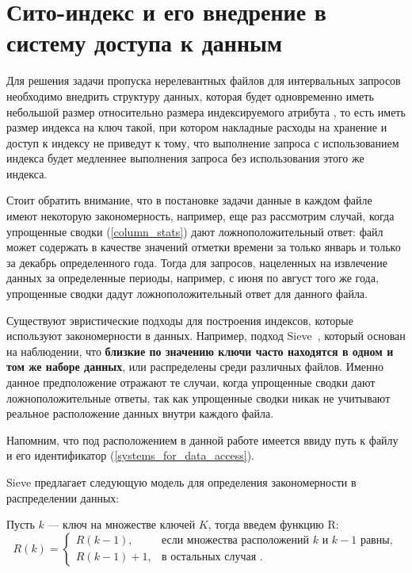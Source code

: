 \section{Сито-индекс и его внедрение в систему доступа к данным}

Для решения задачи пропуска нерелевантных файлов для интервальных запросов необходимо внедрить структуру данных, которая будет одновременно иметь небольшой размер относительно размера индексируемого атрибута , то есть иметь размер индекса на ключ  такой, при котором накладные расходы на хранение и доступ к индексу не приведут к тому, что выполнение запроса с использованием индекса будет медленнее выполнения запроса без использования этого же индекса.

Стоит обратить внимание, что в постановке задачи  данные в каждом файле имеют некоторую закономерность, например, еще раз рассмотрим случай, когда упрощенные сводки (\ref{column_stats}) дают ложноположительный ответ: файл может содержать в качестве значений отметки времени за только январь и только за декабрь определенного года.
Тогда для запросов, нацеленных на извлечение данных за определенные периоды, например, с июня по август того же года, упрощенные сводки дадут ложноположительный ответ для данного файла.

Существуют эвристические подходы для построения индексов, которые используют закономерности в данных.
Например, подход Sieve~\cite{Sieve}, который основан на наблюдении, что \textbf{близкие по значению ключи часто находятся в одном и том же наборе данных}, или распределены среди различных файлов.
Именно данное предположение отражают те случаи, когда упрощенные сводки дают ложноположительные ответы, так как упрощенные сводки никак не учитывают реальное расположение данных внутри каждого файла.

Напомним, что под расположением в данной работе имеется ввиду путь к файлу и его идентификатор (\ref{systems_for_data_access}).

Sieve предлагает следующую модель для определения закономерности в распределении данных:

Пусть $k$ --- ключ на множестве ключей $K$, тогда введем функцию R:
\begin{equation}\label{R_CDF}
R(k) = 
\begin{cases} 
    R(k - 1), & \text{если множества расположений $k$ и $k - 1$ равны}, \\
    R(k - 1) + 1, & \text{в остальных случая }.
\end{cases}
\end{equation}


